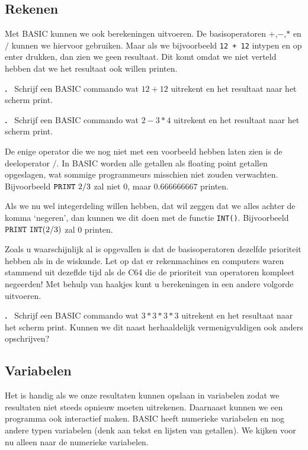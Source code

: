 \documentclass{article}
\newcounter{problem}
\newcounter{solution}
\newcommand\problem{%
  \stepcounter{problem}%
  \textbf{\theproblem.}~%
  \setcounter{solution}{0}%
}
\begin{document}
\subsection{Rekenen}

Met BASIC kunnen we ook berekeningen uitvoeren.
De basisoperatoren $+$,$-$,$*$ en $/$ kunnen we hiervoor gebruiken.
Maar als we bijvoorbeeld \verb:12 + 12: intypen en op enter drukken, dan zien we geen resultaat.
Dit komt omdat we niet verteld hebben dat we het resultaat ook willen printen.

\problem Schrijf een BASIC commando wat $12 + 12$ uitrekent en het resultaat naar het scherm print.

\problem Schrijf een BASIC commando wat $2 - 3 * 4$ uitrekent en het resultaat naar het scherm print.

De enige operator die we nog niet met een voorbeeld hebben laten zien is de deeloperator $/$.
In BASIC worden alle getallen als floating point getallen opgeslagen, wat sommige programmeurs misschien niet zouden verwachten.
Bijvoorbeeld $\verb:PRINT:\ 2/3$ zal niet $0$, maar $0.666666667$ printen.

Als we nu wel integerdeling willen hebben, dat wil zeggen dat we alles achter de komma `negeren',
dan kunnen we dit doen met de functie \verb:INT():.
Bijvoorbeeld $\verb:PRINT:\ \verb:INT:(2/3)$ zal $0$ printen.

Zoals u waarschijnlijk al is opgevallen is dat de basisoperatoren dezelfde prioriteit hebben als in de wiskunde.
Let op dat er rekenmachines en computers waren stammend uit dezeflde tijd als de C64 die de prioriteit van operatoren kompleet negeerden!
Met behulp van haakjes kunt u berekeningen in een andere volgorde uitvoeren.

\problem Schrijf een BASIC commando wat $3*3*3*3$ uitrekent en het resultaat naar het scherm print.
Kunnen we dit naast herhaaldelijk vermenigvuldigen ook anders opschrijven?

\subsection{Variabelen}

Het is handig als we onze resultaten kunnen opslaan in variabelen zodat we resultaten niet steeds opnieuw moeten uitrekenen.
Daarnaast kunnen we een programma ook interactief maken.
BASIC heeft numerieke variabelen en nog andere typen variabelen (denk aan tekst en lijsten van getallen).
We kijken voor nu alleen naar de numerieke variabelen.
\end{document}
